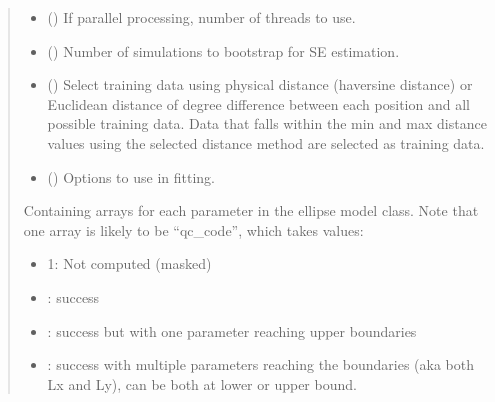 \documentclass[letterpaper,10pt,english]{sphinxmanual}
\begin{document}
\begin{fulllineitems}
\begin{fulllineitems}
\begin{quote}
\begin{description}
\begin{itemize}
\item {}
\sphinxAtStartPar
{} () \textendash{} If parallel processing, number of threads to use.

\item {}
\sphinxAtStartPar
{} () \textendash{} Number of simulations to bootstrap for SE estimation.

\item {}
\sphinxAtStartPar
{} () \textendash{} Select training data using physical distance (haversine distance) or
Euclidean distance of degree difference between each position and
all possible training data. Data that falls within the min and max
distance values using the selected distance method are selected as
training data.

\item {}
\sphinxAtStartPar
{} () \textendash{} Options to use in fitting.

\end{itemize}

\sphinxAtStartPar

\sphinxAtStartPar
{} \textendash{} Containing arrays for each parameter in the ellipse model class.
Note that one array is likely to be “qc\_code”, which takes values:
\begin{itemize}
\item {}
\sphinxAtStartPar
\sphinxhyphen{}1: Not computed (masked)

\item {}
: success

\item {}
: success but with one parameter reaching upper
boundaries

\item {}
: success with multiple parameters reaching the
boundaries (aka both Lx and Ly), can be both at lower or
upper bound.


\end{itemize}
\end{description}
\end{quote}
\end{fulllineitems}
\end{fulllineitems}
\end{document}
